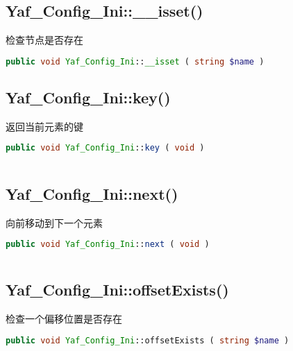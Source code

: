 \subsection{Yaf\_Config\_Ini::\_\_isset()}

检查节点是否存在

\begin{lstlisting}[language=PHP]
public void Yaf_Config_Ini::__isset ( string $name )
\end{lstlisting}


\subsection{Yaf\_Config\_Ini::key()}

返回当前元素的键


\begin{lstlisting}[language=PHP]
public void Yaf_Config_Ini::key ( void )
\end{lstlisting}



\begin{lstlisting}[language=PHP]

\end{lstlisting}


\subsection{Yaf\_Config\_Ini::next()}

向前移动到下一个元素

\begin{lstlisting}[language=PHP]
public void Yaf_Config_Ini::next ( void )
\end{lstlisting}

\begin{lstlisting}[language=PHP]

\end{lstlisting}



\subsection{Yaf\_Config\_Ini::offsetExists()}

检查一个偏移位置是否存在

\begin{lstlisting}[language=PHP]
public void Yaf_Config_Ini::offsetExists ( string $name )
\end{lstlisting}

